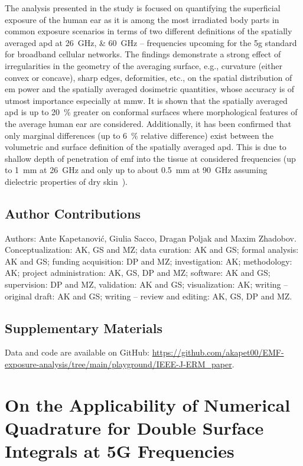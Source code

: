 The analysis presented in the study is focused on quantifying the superficial exposure of the human ear as it is among the most irradiated body parts in common exposure scenarios in terms of two different definitions of the spatially averaged \gls{apd} at \SIlist{26;60}{\GHz} -- frequencies upcoming for the \gls{5g} standard for broadband cellular networks.
The findings demonstrate a strong effect of irregularities in the geometry of the averaging surface, e.g., curvature (either convex or concave), sharp edges, deformities, etc., on the spatial distribution of \gls{em} power and the spatially averaged dosimetric quantities, whose accuracy is of utmost importance especially at \gls{mmw}.
It is shown that the spatially averaged \gls{apd} is up to \SI{20}{\percent} greater on conformal surfaces where morphological features of the average human ear are considered.
Additionally, it has been confirmed that only marginal differences (up to \SI{6}{\percent} relative difference) exist between the volumetric and surface definition of the spatially averaged \gls{apd}.
This is due to shallow depth of penetration of \gls{emf} into the tissue at considered frequencies (up to \SI{1}{\mm} at \SI{26}{\GHz} and only up to about \SI{0.5}{\mm} at \SI{90}{\GHz} assuming dielectric properties of dry skin~\cite{Sasaki2017Monte}).

\subsection{Author Contributions}
Authors: Ante Kapetanović, Giulia Sacco, Dragan Poljak and Maxim Zhadobov.\\
Conceptualization: AK, GS and MZ; data curation: AK and GS; formal analysis: AK and GS; funding acquisition: DP and MZ; investigation: AK; methodology: AK; project administration: AK, GS, DP and MZ; software: AK and GS; supervision: DP and MZ, validation: AK and GS; visualization: AK; writing -- original draft: AK and GS; writing -- review and editing: AK, GS, DP and MZ.

\subsection{Supplementary Materials}
Data and code are available on GitHub: \url{https://github.com/akapet00/EMF-exposure-analysis/tree/main/playground/IEEE-J-ERM_paper}.


\section{On the Applicability of Numerical Quadrature for Double Surface Integrals at 5G Frequencies}
\label{sec:publication_4}
